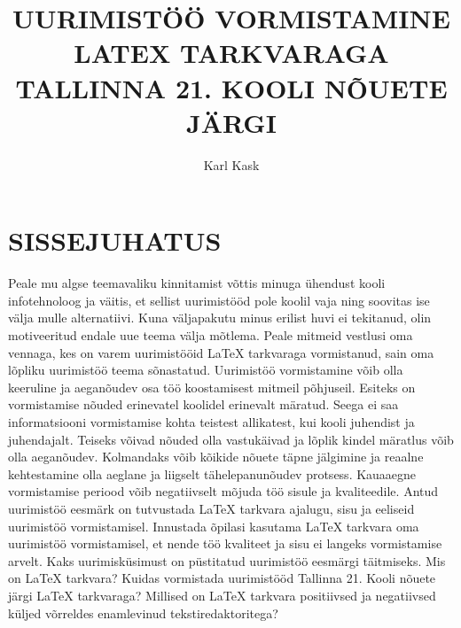 \documentclass{21kuur}
\title{UURIMIST\"{O}\"{O} VORMISTAMINE LATEX TARKVARAGA TALLINNA 21. KOOLI N\~{O}UETE J\"{A}RGI}
\author{Karl Kask}
\begin{document}
\maketitle
\tableofcontents

\newpage
\chapter*{SISSEJUHATUS}
Peale mu algse teemavaliku kinnitamist v\~{o}ttis minuga \"{u}hendust kooli infotehnoloog ja v\"{a}itis, et sellist uurimist\"{o}\"{o}d pole koolil vaja ning soovitas ise v\"{a}lja mulle alternatiivi. Kuna v\"{a}ljapakutu minus erilist huvi ei tekitanud, olin motiveeritud endale uue teema v\"{a}lja m\~{o}tlema. Peale mitmeid vestlusi oma vennaga, kes on varem uurimist\"{o}\"{o}id LaTeX tarkvaraga vormistanud, sain oma l\~{o}pliku uurimist\"{o}\"{o} teema s\~{o}nastatud.
Uurimist\"{o}\"{o} vormistamine v\~{o}ib olla keeruline ja aegan\~{o}udev osa t\"{o}\"{o} koostamisest mitmeil p\~{o}hjuseil. Esiteks on vormistamise n\~{o}uded erinevatel koolidel erinevalt m\"{a}ratud. Seega ei saa informatsiooni vormistamise kohta teistest allikatest, kui kooli juhendist ja juhendajalt. Teiseks v\~{o}ivad n\~{o}uded olla vastuk\"{a}ivad ja l\~{o}plik kindel m\"{a}ratlus v\~{o}ib olla aegan\~{o}udev. Kolmandaks v\~{o}ib k\~{o}ikide n\~{o}uete t\"{a}pne j\"{a}lgimine ja reaalne kehtestamine olla aeglane ja liigselt t\"{a}helepanun\~{o}udev protsess. Kauaaegne vormistamise periood v\~{o}ib negatiivselt m\~{o}juda t\"{o}\"{o} sisule ja kvaliteedile.
Antud uurimist\"{o}\"{o} eesm\"{a}rk on tutvustada LaTeX tarkvara ajalugu, sisu ja eeliseid uurimist\"{o}\"{o} vormistamisel. Innustada \~{o}pilasi kasutama LaTeX tarkvara oma uurimist\"{o}\"{o} vormistamisel, et nende t\"{o}\"{o} kvaliteet ja sisu ei langeks vormistamise arvelt. 
Kaks uurimisk\"{u}simust on p\"{u}stitatud uurimist\"{o}\"{o} eesm\"{a}rgi t\"{a}itmiseks. Mis on LaTeX tarkvara? Kuidas vormistada uurimist\"{o}\"{o}d Tallinna 21. Kooli n\~{o}uete j\"{a}rgi LaTeX tarkvaraga? Millised on LaTeX tarkvara positiivsed ja negatiivsed k\"{u}ljed v\~{o}rreldes enamlevinud tekstiredaktoritega?
\newpage
\end{document}
